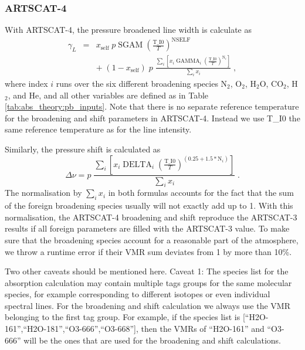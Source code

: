 \subsubsection{ARTSCAT-4}

With ARTSCAT-4, the pressure broadened line width is calculate as
\begin{eqnarray}
  \gamma_L &=& x_\mathrm{self} \; p \; \mathrm{SGAM} \; 
               \left(
               \frac{\mathrm{T\_I0}}{T}
               \right)^{\mathrm{NSELF}}
               \nonumber \\
           & & + \; (1-x_\mathrm{self}) \; p \; 
               \frac{\sum_i \left[ x_i \; \mathrm{GAMMA}_i \;
                     \left(
                     \frac{\mathrm{T\_I0}}{T}
                     \right)^{\mathrm{N}_i} \right] }
               {\sum_i x_i} \;,
\end{eqnarray}
where index $i$ runs over the six different broadening species N$_2$,
O$_2$, H$_2$O, CO$_2$, H$_2$, and He, and all other variables are
defined as in Table \ref{tab:abs_theory:pb_inputs}. Note that there is
no separate reference temperature for the broadening and shift
parameters in ARTSCAT-4. Instead we use T\_I0 the same reference
temperature as for the line intensity.
 
Similarly, the pressure shift is calculated as
\begin{equation}
\Delta \nu = p \; 
             \frac{\sum_i \left[ x_i \; \mathrm{DELTA}_i \;
                   \left(
                   \frac{\mathrm{T\_I0}}{T}
                   \right)^{(0.25 + 1.5 * \mathrm{N}_i)} \right] }
             {\sum_i x_i} \;.
\end{equation}
The normalisation by $\sum_i x_i$ in both formulas accounts for the fact that the sum
of the foreign broadening species usually will not exactly add up to
1. With this normalisation, the ARTSCAT-4 broadening and shift
reproduce the
ARTSCAT-3  results if all foreign parameters are filled with the
ARTSCAT-3 value. To make sure that the broadening species account for
a reasonable part of the atmosphere, we throw a runtime error if their
VMR sum deviates from 1 by more than 10\%.

Two other caveats should be mentioned here. Caveat 1: The species list for the
absorption calculation may contain multiple tags groups for the same
molecular species, for example corresponding to different isotopes or
even individual spectral lines. For the broadening and shift
calculation we always use the VMR belonging to the first tag
group. For example, if the species list is
[``H2O-161'',``H2O-181'',``O3-666'',``O3-668''], then the VMRs of
``H2O-161'' and ``O3-666'' will be the ones that are used for the broadening and
shift calculations.

